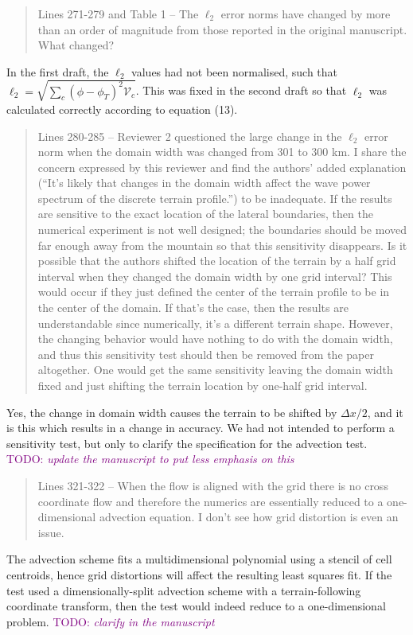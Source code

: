 \documentclass{article}
\newcommand{\TODO}[1]{\textcolor{purple}{TODO: \emph{#1}}}
\begin{document}
\begin{quotation}
 Lines 271-279 and Table 1 – The $\ell_2$ error norms have changed by more than an order  of magnitude from those reported in the original manuscript. What changed?
\end{quotation}
In the first draft, the $\ell_2$ values had not been normalised, such that $\ell_2 = \sqrt{\sum_c \left(\phi - \phi_T\right)^2 \mathcal{V}_c}$.  This was fixed in the second draft so that $\ell_2$ was calculated correctly according to equation (13).
\begin{quotation}
 Lines 280-285 – Reviewer 2 questioned the large change in the $\ell_2$ error norm when 
 the domain width was changed from 301 to 300 km. I share the concern expressed 
 by this reviewer and find the authors' added explanation (``It's likely that changes in 
 the domain width affect the wave power spectrum of the discrete terrain profile.'') to 
 be inadequate. If the results are sensitive to the exact location of the lateral 
 boundaries, then the numerical experiment is not well designed; the boundaries 
 should be moved far enough away from the mountain so that this sensitivity 
 disappears.  Is it possible that the authors shifted the location of the terrain by a half 
 grid interval when they changed the domain width by one grid interval? This would 
 occur if they just defined the center of the terrain profile to be in the center of the 
 domain. If that’s the case, then the results are understandable since numerically, it's a 
 different terrain shape. However, the changing behavior would have nothing to do 
 with the domain width, and thus this sensitivity test should then be removed from 
 the paper altogether. One would get the same sensitivity leaving the domain width 
 fixed and just shifting the terrain location by one-half grid interval.  
\end{quotation}
Yes, the change in domain width causes the terrain to be shifted by $\Delta x / 2$, and it is this which results in a change in accuracy.  We had not intended to perform a sensitivity test, but only to clarify the specification for the \citet{schaer2002} advection test.  \TODO{update the manuscript to put less emphasis on this}

\begin{quotation}
 Lines 321-322 – When the flow is aligned with the grid there is no cross coordinate 
 flow and therefore the numerics are essentially reduced to a one-dimensional 
 advection equation. I don't see how grid distortion is even an issue. 
\end{quotation}
The advection scheme fits a multidimensional polynomial using a stencil of cell centroids, hence grid distortions will affect the resulting least squares fit.  If the test used a dimensionally-split advection scheme with a terrain-following coordinate transform, then the test would indeed reduce to a one-dimensional problem.  \TODO{clarify in the manuscript}
\end{document}

